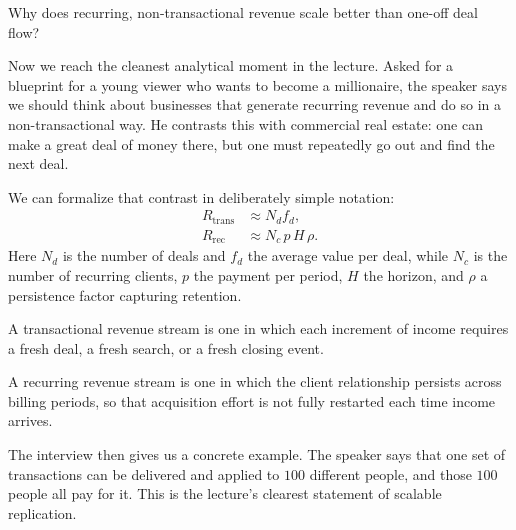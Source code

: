Why does recurring, non-transactional revenue scale better than one-off deal flow?

Now we reach the cleanest analytical moment in the lecture. Asked for a blueprint for a young viewer who wants to become a millionaire, the speaker says we should think about businesses that generate recurring revenue and do so in a non-transactional way. He contrasts this with commercial real estate: one can make a great deal of money there, but one must repeatedly go out and find the next deal.

We can formalize that contrast in deliberately simple notation:
\begin{align}
R_{\text{trans}} &\approx N_d f_d, \\
R_{\text{rec}} &\approx N_c\,p\,H\,\rho.
\end{align}
Here \(N_d\) is the number of deals and \(f_d\) the average value per deal, while \(N_c\) is the number of recurring clients, \(p\) the payment per period, \(H\) the horizon, and \(\rho\) a persistence factor capturing retention.

\begin{definition}
A transactional revenue stream is one in which each increment of income requires a fresh deal, a fresh search, or a fresh closing event.
\end{definition}

\begin{definition}
A recurring revenue stream is one in which the client relationship persists across billing periods, so that acquisition effort is not fully restarted each time income arrives.
\end{definition}

The interview then gives us a concrete example. The speaker says that one set of transactions can be delivered and applied to \(100\) different people, and those \(100\) people all pay for it. This is the lecture's clearest statement of scalable replication.

